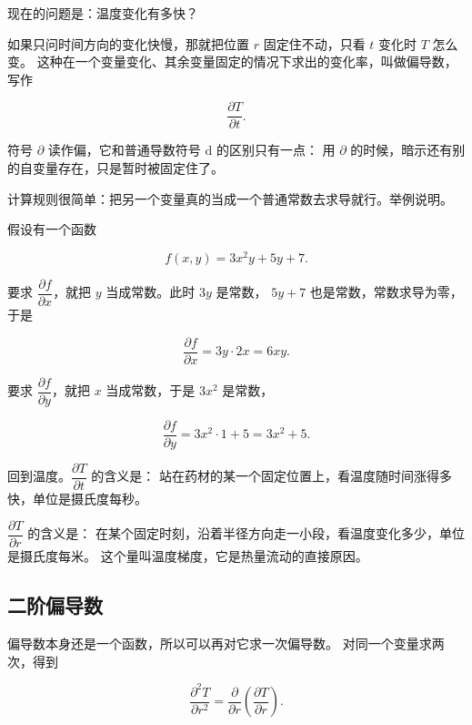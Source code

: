 现在的问题是：温度变化有多快？

如果只问时间方向的变化快慢，那就把位置 $r$ 固定住不动，只看 $t$ 变化时 $T$ 怎么变。
这种在一个变量变化、其余变量固定的情况下求出的变化率，叫做偏导数，写作

\begin{equation}
\frac{\partial T}{\partial t}.
\end{equation}

符号 $\partial$ 读作偏，它和普通导数符号 $\mathrm{d}$ 的区别只有一点：
用 $\partial$ 的时候，暗示还有别的自变量存在，只是暂时被固定住了。

计算规则很简单：把另一个变量真的当成一个普通常数去求导就行。举例说明。

假设有一个函数

\begin{equation}
f(x,y) = 3x^2 y + 5y + 7 .
\end{equation}

要求 $\dfrac{\partial f}{\partial x}$，就把 $y$ 当成常数。此时 $3y$ 是常数，
$5y+7$ 也是常数，常数求导为零，于是

\begin{equation}
\frac{\partial f}{\partial x} = 3y \cdot 2x = 6xy .
\end{equation}

要求 $\dfrac{\partial f}{\partial y}$，就把 $x$ 当成常数，于是 $3x^2$ 是常数，

\begin{equation}
\frac{\partial f}{\partial y} = 3x^2 \cdot 1 + 5 = 3x^2 + 5 .
\end{equation}

回到温度。$\dfrac{\partial T}{\partial t}$ 的含义是：
站在药材的某一个固定位置上，看温度随时间涨得多快，单位是摄氏度每秒。

$\dfrac{\partial T}{\partial r}$ 的含义是：
在某个固定时刻，沿着半径方向走一小段，看温度变化多少，单位是摄氏度每米。
这个量叫温度梯度，它是热量流动的直接原因。

\subsection{二阶偏导数}

偏导数本身还是一个函数，所以可以再对它求一次偏导数。
对同一个变量求两次，得到

\begin{equation}
\frac{\partial^2 T}{\partial r^2}
= \frac{\partial}{\partial r}\left(\frac{\partial T}{\partial r}\right).
\end{equation}

